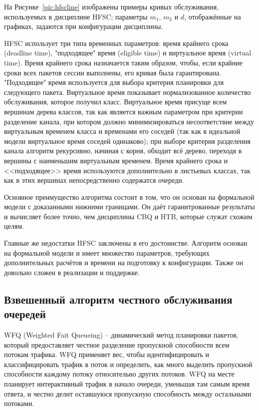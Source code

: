 		На Рисунке~\ref{pic:hfscline} изображены примеры кривых обслуживания, используемых
		в дисциплине HFSC; параметры $m_1$, $m_2$ и $d$, отображённые на графиках, задаются
		при конфигурации дисциплины.\cite{hfscguide}

        HFSC использует три типа временных параметров: время крайнего срока (deadline
        time), "подходящее" время (eligible time) и виртуальное время (virtual time). Время крайнего
        срока назначается таким образом, чтобы, если крайние сроки всех пакетов сессии
        выполнены, его кривая была гарантирована. "Подходящее" время используется для
        выбора критерия планировки для следующего пакета. Виртуальное время показывает
        нормализованное количество обслуживания, которое получил класс. Виртуальное
        время присуще всем вершинам дерева классов, так как является важным параметром
        при критерии разделение канала, при котором должно минимизироваться
        несоответствие между виртуальным временем класса и временами его соседей
        (так как в идеальной модели виртуальное время соседей одинаково); при выборе
        критерия разделения канала алгоритм рекурсивно, начиная с корня, обходит всё
        дерево, переходя в вершины с наименьшим виртуальным временем. Время крайнего
        срока и <<подходящее>> время используются дополнительно в листьевых классах,
        так как в этих вершинах непосредственно содержатся очереди.\cite{hfsc}

		Основное преимущество алгоритма состоит в том, что он основан
		на формальной модели с доказанными нижними границами. Он даёт гаранитрованные
		результаты и вычисляет более точно, чем дисциплины CBQ и HTB, которые
		служат схожим целям.

		Главные же недостатки HFSC заключены в его достоинстве. Алгоритм основан
		на формальной модели и имеет множество параметров, требующих дополнительных
		расчётов и времени на подготовку к конфигурации. Также он довольно сложен
		в реализации и поддержке. 

    \subsection{Взвешенный алгоритм честного обслуживания очередей}

    WFQ (Weighted Fait Queueing) -- динамический метод планировки пакетов, который
    предоставляет честное разделение пропускной способности всем потокам трафика.
    WFQ применяет вес, чтобы идентифицировать и классифицировать трафик
    в поток и определить, как много выделить пропускной способности каждому
    потоку относительно других потоков. WFQ на месте планирует интерактивный трафик в начало очереди,
    уменьшая там самым время ответа, и честно делит оставшуюся пропускную
    способность между остальными потоками. \cite{ciscoguide}


